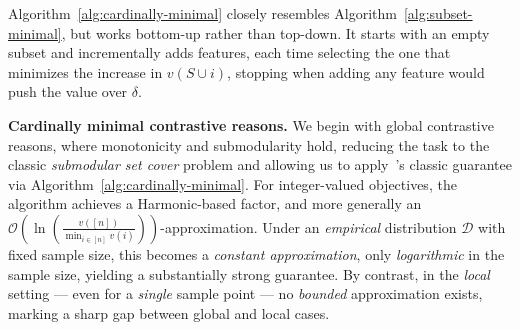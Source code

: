 \documentclass{article}
\begin{document}
Algorithm~\ref{alg:cardinally-minimal} closely resembles Algorithm~\ref{alg:subset-minimal}, but works bottom-up rather than top-down. It starts with an empty subset and incrementally adds features, each time selecting the one that minimizes the increase in $v(S \cup {i})$, stopping when adding any feature would push the value over $\delta$.







\textbf{Cardinally minimal contrastive reasons.} We begin with global contrastive reasons, where monotonicity and submodularity hold, reducing the task to the classic \emph{submodular set cover} problem and allowing us to apply~\cite{wolsey1982analysis}'s classic guarantee via Algorithm~\ref{alg:cardinally-minimal}. For integer-valued objectives, the algorithm achieves a Harmonic-based factor, and more generally an $\mathcal{O}\!\left(\ln\!\left(\tfrac{v([n])}{\min_{i \in [n]} v(i)}\right)\right)$-approximation. Under an \emph{empirical} distribution $\mathcal{D}$ with fixed sample size, this becomes a \emph{constant approximation}, only \emph{logarithmic} in the sample size, yielding a substantially strong guarantee. By contrast, in the \emph{local} setting --- even for a \emph{single} sample point --- no \emph{bounded} approximation exists, marking a sharp gap between global and local cases.


\end{document}
